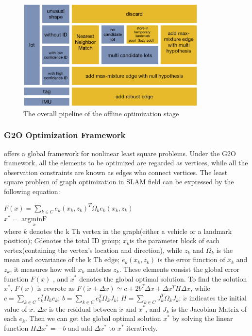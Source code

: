 \documentclass[journal]{IEEEtran}
\begin{document}
\begin{figure}
\centering
\includegraphics[height = 2.2in]{pic/fig8_Optimize}
\caption{
The overall pipeline of the offline optimization stage
}\label{fig:8}
\end{figure}

\subsubsection{G2O Optimization Framework}
\cite{K2011G2o} offers a global framework for nonlinear least square problems. 
Under the G2O framework, all the elements to be optimized are regarded as vertices, while all the observation constraints are known as edges who connect vertices. 
The least square problem of graph optimization in SLAM field can be expressed by the following equation:

$F(x)=\sum\limits_{k \in C}e_k{(x_k,z_k)}^T{\Omega}_k e_k(x_k,z_k)$\cite{K2011G2o}\\
$x^{*} = \mathop{argminF(x)}\limits_x$\cite{K2011G2o}\\
where $k$ denotes the k Th vertex in the graph(either a vehicle or a landmark position);  
$C$denotes the total ID group; $x_k$is the parameter block of each vertex(containing the vertex’s location and direction), 
while $z_k$ and $\Omega_k$ is the mean and covariance of the k Th edge; 
$e_k(x_k,z_k)$ is the error function of $x_k$ and $z_k$, it measures how well $x_k$ matches $z_k$. 
These elements consist the global error function $F(x)$ , and $x^*$ denotes the global optimal solution.
To find the solution $x^*$, $F(x)$ is rewrote as $F(\check{x}+\Delta x)\simeq c+2b^T \Delta x + \Delta x^T H \Delta x$, 
while $c=\sum\limits_{k \in C}e_k^T \Omega_k e_k$; 
$b=\sum\limits_{k \in C}e_k^T \Omega_k J_k$; 
$H=\sum\limits_{k \in C}J_k^T \Omega_k J_k$; 
$\check{x}$ indicates the initial value of ${x}$. 
$\Delta x$ is the residual between $\check{x}$  and $x^*$, and $J_k$ is the Jacobian Matrix of each $e_k$. 
Then we can get the global optimal solution $x^*$ by solving the linear function $H\Delta x^*=-b$ and add $\Delta x^*$ to $x^*$ iteratively.
\end{document}
